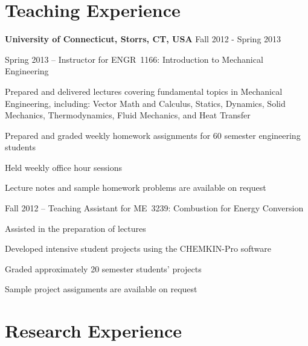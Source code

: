 \section{Teaching Experience}
\textbf{University of Connecticut, Storrs, CT, USA} \hfill Fall 2012 - Spring 2013
\begin{outerlist}
    \item[] Spring 2013 -- Instructor for ENGR~1166: Introduction to Mechanical Engineering
        \begin{innerlist}
            \item Prepared and delivered lectures covering fundamental topics in Mechanical Engineering, including: Vector Math and Calculus, Statics, Dynamics, Solid Mechanics, Thermodynamics, Fluid Mechanics, and Heat Transfer
            \item Prepared and graded weekly homework assignments for 60  semester engineering students
            \item Held weekly office hour sessions
            \item[] Lecture notes and sample homework problems are available on request
        \end{innerlist}

   \item[] Fall 2012 -- Teaching Assistant for ME~3239: Combustion for Energy Conversion
        \begin{innerlist}
            \item Assisted in the preparation of lectures
            \item Developed intensive student projects using the CHEMKIN-Pro software 
            \item Graded approximately 20  semester students' projects
            \item[] Sample project assignments are available on request
        \end{innerlist}

\end{outerlist}


\section{Research Experience}

